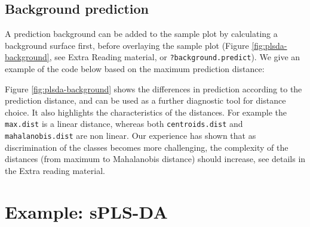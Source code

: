 \documentclass[
]{book}
\newenvironment{Shaded}{\begin{snugshade}}{\end{snugshade}}
\newcommand{\AttributeTok}[1]{\textcolor[rgb]{0.77,0.63,0.00}{#1}}
\newcommand{\ConstantTok}[1]{\textcolor[rgb]{0.00,0.00,0.00}{#1}}
\newcommand{\DecValTok}[1]{\textcolor[rgb]{0.00,0.00,0.81}{#1}}
\newcommand{\FunctionTok}[1]{\textcolor[rgb]{0.00,0.00,0.00}{#1}}
\newcommand{\NormalTok}[1]{#1}
\newcommand{\OtherTok}[1]{\textcolor[rgb]{0.56,0.35,0.01}{#1}}
\newcommand{\SpecialCharTok}[1]{\textcolor[rgb]{0.00,0.00,0.00}{#1}}
\newcommand{\StringTok}[1]{\textcolor[rgb]{0.31,0.60,0.02}{#1}}
\begin{document}
\hypertarget{ex:plsda:background}{%
\subsection{Background prediction}\label{ex:plsda:background}}

A prediction background can be added to the sample plot by calculating a background surface first, before overlaying the sample plot (Figure \ref{fig:plsda-background}, see Extra Reading material, or \texttt{?background.predict}). We give an example of the code below based on the maximum prediction distance:

\begin{Shaded}
\end{Shaded}



Figure \ref{fig:plsda-background} shows the differences in prediction according to the prediction distance, and can be used as a further diagnostic tool for distance choice. It also highlights the characteristics of the distances. For example the \texttt{max.dist} is a linear distance, whereas both \texttt{centroids.dist} and \texttt{mahalanobis.dist} are non linear. Our experience has shown that as discrimination of the classes becomes more challenging, the complexity of the distances (from maximum to Mahalanobis distance) should increase, see details in the Extra reading material.

\hypertarget{ex:splsda}{%
\section{Example: sPLS-DA}\label{ex:splsda}}
\end{document}
